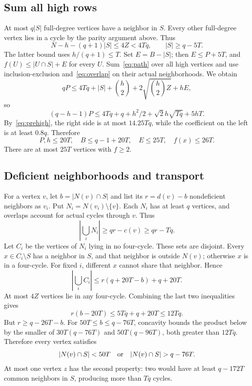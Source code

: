 \documentclass[11pt]{article}
\theoremstyle{remark}\newtheorem*{remark}{Remark}
\begin{document}
\subsection{Sum all high rows}
At most $q|S|$ full-degree vertices have a neighbor in $S$. Every other full-degree vertex lies in a cycle by the parity argument above. Thus
\[
 N-h-(q+1)|S|\leq4Z<4Tq,\qquad |S|\geq q-5T.
\]
The latter bound uses $h/(q+1)\leq T$. Set $E=B-|S|$; then $E\leq P+5T$, and $f(U)\leq|U\cap S|+E$ for every $U$. Sum~\eqref{eq:path} over all high vertices and use inclusion-exclusion and~\eqref{eq:overlap} on their actual neighborhoods. We obtain
\[
 qP\leq4Tq+|S|+\binom h2+2\sqrt{\binom h2Z}+hE,
\]
so
\[
 (q-h-1)P\leq4Tq+q+h^2/2+\sqrt2h\sqrt{Tq}+5hT.
\]
By~\eqref{eq:prehigh}, the right side is at most $14.25Tq$, while the coefficient on the left is at least $0.8q$. Therefore
\begin{equation}\label{eq:strong}
 P,h\leq20T,\quad B\leq q-1+20T,\quad E\leq25T,\quad f(x)\leq26T.
\end{equation}
There are at most $25T$ vertices with $f\geq2$.

\subsection{Deficient neighborhoods and transport}
For a vertex $v$, let $b=|N(v)\cap S|$ and list its $r=d(v)-b$ nondeficient neighbors as $v_i$. Put $N_i=N(v_i)\setminus\{v\}$. Each $N_i$ has at least $q$ vertices, and overlaps account for actual cycles through $v$. Thus
\[
 |\bigcup_iN_i|\geq qr-c(v)\geq qr-Tq.
\]
Let $C_i$ be the vertices of $N_i$ lying in no four-cycle. These sets are disjoint. Every $x\in C_i\setminus S$ has a neighbor in $S$, and that neighbor is outside $N(v)$; otherwise $x$ is in a four-cycle. For fixed $i$, different $x$ cannot share that neighbor. Hence
\[
 |\bigcup_iC_i|\leq r(q+20T-b)+q+20T.
\]
At most $4Z$ vertices lie in any four-cycle. Combining the last two inequalities gives
\[
 r(b-20T)\leq5Tq+q+20T\leq12Tq.
\]
But $r\geq q-26T-b$. For $50T\leq b\leq q-76T$, concavity bounds the product below by the smaller of $30T(q-76T)$ and $50T(q-96T)$, both greater than $12Tq$. Therefore every vertex satisfies
\begin{equation}\label{eq:dichotomy}
 |N(v)\cap S|<50T\quad\hbox{or}\quad |N(v)\cap S|>q-76T.
\end{equation}
At most one vertex $z$ has the second property: two would have at least $q-172T$ common neighbors in $S$, producing more than $Tq$ cycles.
\end{document}
